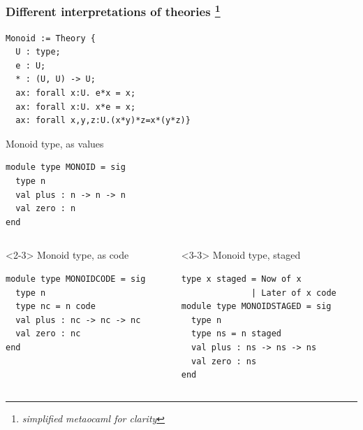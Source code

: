 \documentclass{beamer}
\begin{document}
\lstset{language=mathscheme,basicstyle=\scriptsize}
\begin{frame}[t,fragile]
\frametitle{Different interpretations of theories
\footnote{\scriptsize \textit{simplified metaocaml for clarity}}
}
\begin{minipage}{6.8cm}
\begin{lstlisting}
Monoid := Theory { 
  U : type;
  e : U;
  * : (U, U) -> U;
  ax: forall x:U. e*x = x;
  ax: forall x:U. x*e = x;
  ax: forall x,y,z:U.(x*y)*z=x*(y*z)}
\end{lstlisting}
\end{minipage}
\lstset{language=metaocaml,basicstyle=\scriptsize}
\begin{minipage}{5.4cm}
Monoid type, as values
\begin{lstlisting}
module type MONOID = sig
  type n
  val plus : n -> n -> n
  val zero : n
end

\end{lstlisting}
\end{minipage}
\vspace*{.3cm}\hspace*{-.3cm}
\begin{columns}[T]
\begin{column}{6.0cm}
\begin{onlyenv}<2-3>
Monoid type, as code
\begin{lstlisting}
module type MONOIDCODE = sig
  type n
  type nc = n code
  val plus : nc -> nc -> nc
  val zero : nc
end

\end{lstlisting}
\end{onlyenv}
\end{column}
\begin{column}{5.5cm}
\begin{onlyenv}<3-3>
Monoid type, staged
\begin{lstlisting}
type x staged = Now of x 
              | Later of x code
module type MONOIDSTAGED = sig
  type n
  type ns = n staged
  val plus : ns -> ns -> ns
  val zero : ns
end
\end{lstlisting}
\end{onlyenv}
\end{column}
\end{columns}
\end{frame}
\end{document}
